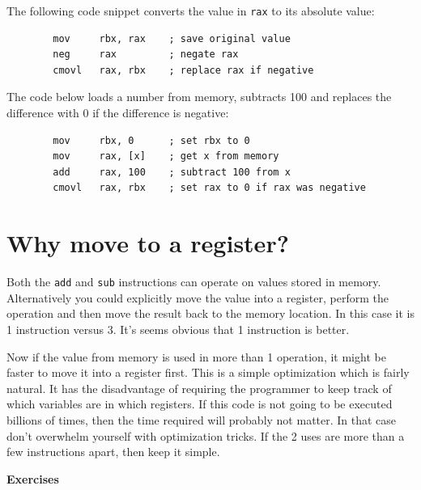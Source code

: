 \documentclass[11pt,b5paper]{book}
\begin{document}
The following code snippet converts the value in {\tt rax} to its absolute
value:
\begin{verbatim}
        mov     rbx, rax    ; save original value
        neg     rax         ; negate rax
        cmovl   rax, rbx    ; replace rax if negative
\end{verbatim}

The code below loads a number from memory, subtracts 100 and replaces
the difference with 0 if the difference is negative:
            
\begin{verbatim}
        mov     rbx, 0      ; set rbx to 0
        mov     rax, [x]    ; get x from memory
        add     rax, 100    ; subtract 100 from x
        cmovl   rax, rbx    ; set rax to 0 if rax was negative
\end{verbatim}

\section{Why move to a register?}

Both the {\tt add} and {\tt sub} instructions can operate on values stored in
memory.
Alternatively you could explicitly move the value into a register, perform the
operation and then move the result back to the memory location.
In this case it is 1 instruction versus 3.
It's seems obvious that 1 instruction is better.

Now if the value from memory is used in more than 1 operation, it might be
faster to move it into a register first.
This is a simple optimization which is fairly natural.
It has the disadvantage of requiring the programmer to keep track of which
variables are in which registers.
If this code is not going to be executed billions of times, then the time
required will probably not matter.
In that case don't overwhelm yourself with optimization tricks.
If the 2 uses are more than a few instructions apart, then keep it simple.

\vfill
\break
{\bf\large Exercises}
\end{document}
